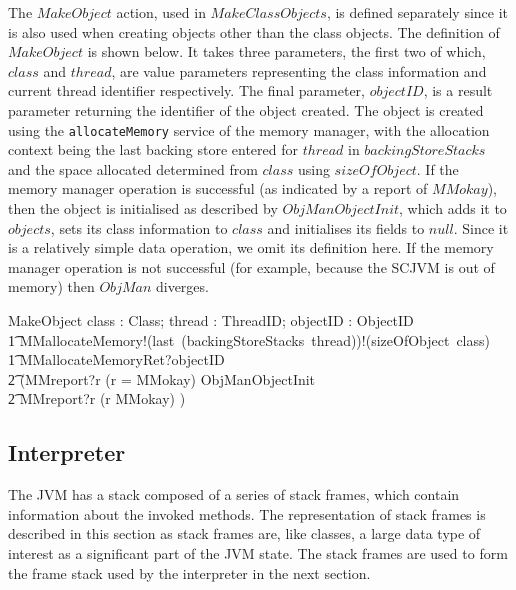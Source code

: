 The $MakeObject$ action, used in $MakeClassObjects$, is defined
separately since it is also used when creating objects other than the
class objects.
The definition of $MakeObject$ is shown below.
It takes three parameters, the first two of which, $class$ and
$thread$, are value parameters representing the class information and
current thread identifier respectively.
The final parameter, $objectID$, is a result parameter returning the
identifier of the object created.
The object is created using the \texttt{allocateMemory} service of the
memory manager, with the allocation context being the last backing
store entered for $thread$ in $backingStoreStacks$ and the space
allocated determined from $class$ using $sizeOfObject$.
If the memory manager operation is successful (as indicated by a
report of $MMokay$), then the object is initialised as described by
$ObjManObjectInit$, which adds it to $objects$, sets its class
information to $class$ and initialises its fields to $null$.
Since it is a relatively simple data operation, we omit its definition
here.
If the memory manager operation is not successful (for example,
because the SCJVM is out of memory) then $ObjMan$ diverges.
\begin{circusaction}
  MakeObject \circdef \circval class : Class; \circval thread : ThreadID; \circres objectID : ObjectID \circspot \\
  \t1 MMallocateMemory!(last~(backingStoreStacks~thread))!(sizeOfObject~class) \then {} \\
  \t1  MMallocateMemoryRet?objectID \then {} \\
  \t2 (MMreport?r \prefixcolon (r = MMokay) \then \lschexpract ObjManObjectInit \rschexpract \\
  \t2 {} \extchoice MMreport?r \prefixcolon (r \neq MMokay) \then \Chaos)
\end{circusaction}

\subsection{Interpreter}
\label{cee-interpreter-subsection}

The JVM has a stack composed of a series of stack frames, which
contain information about the invoked methods.
The representation of stack frames is described in this section as
stack frames are, like classes, a large data type of interest as a
significant part of the JVM state.
The stack frames are used to form the frame stack used by the
interpreter in the next section.

